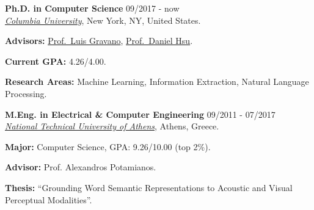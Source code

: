 \documentclass[letterpaper]{article}
\renewenvironment{itemize}{
  \begin{list}{}{
    \setlength{\leftmargin}{1.5em}
  }
}{
  \end{list}
}
\begin{document}
\begin{itemize}
  \item
    \textbf{Ph.D. in Computer Science} \hfill 09/2017 - now\\
    \href{https://www.cs.columbia.edu/}{\it Columbia University}, New York, NY, United States.
     \begin{itemize}
         \item     
         \textbf{Advisors:} \href{http://www.cs.columbia.edu/~gravano/}{Prof.~Luis Gravano}, \href{http://www.cs.columbia.edu/~djhsu/}{Prof.~Daniel Hsu}.
         \item 
            \textbf{Current GPA:} 4.26/4.00.
        \item \textbf{Research Areas:} Machine Learning, Information Extraction, Natural Language Processing.
     \end{itemize}
     

  \item
    \textbf{M.Eng. in Electrical \& Computer Engineering} \hfill 09/2011 - 07/2017\\
    \href{http://ece.ntua.gr/}{\it National Technical University of Athens}, Athens, Greece.
    \begin{itemize}
        \item \textbf{Major:} Computer Science, GPA: 9.26/10.00 (top 2\%).
        \item \textbf{Advisor:} Prof. Alexandros Potamianos.
        \item \textbf{Thesis:} ``Grounding Word Semantic Representations to Acoustic and Visual Perceptual Modalities''.
    \end{itemize}



\end{itemize}
\end{document}
